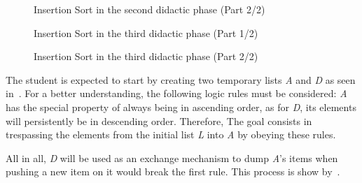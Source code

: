 \begin{figure}[h!]
  \centering
  \caption{Insertion Sort in the second didactic phase (Part 2/2)}
  \label{fig:isort:p2}
\end{figure}

\begin{figure}[h!]
  \centering
  \caption{Insertion Sort in the third didactic phase (Part 1/2)}
\end{figure}

\begin{figure}[h!]
  \centering
  \caption{Insertion Sort in the third didactic phase (Part 2/2)}
  \label{fig:isort:p3}
\end{figure}

The student is expected to start by creating two temporary lists
\emph{A} and \emph{D} as seen in~.
For a better understanding, the following logic rules must be
considered: \emph{A} has the special property of always being in
ascending order, as for \emph{D}, its elements will persistently be in
descending order. Therefore, The goal consists in trespassing the
elements from the initial list \emph{L} into \emph{A} by obeying these
rules.

All in all, \emph{D} will be used as an exchange mechanism
to dump \emph{A}'s items when pushing a new item on it would break the
first rule. This process is show by~.


